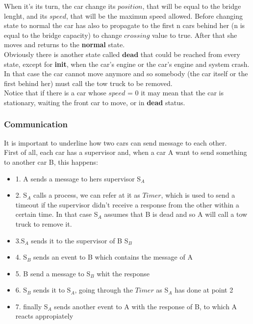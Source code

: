 When it's its turn, the car change its $position$, that will be equal to the bridge lenght, and its $speed$,
that will be the maximun speed allowed. Before changing state to normal the car has also to propagate to the first n cars behind her (n is equal to the bridge capacity) 
to change $crossing$ value to true. After that she moves and returns to the \textbf{normal} state.\\
Obviously there is another state called $\textbf{dead}$ that could be reached from every state, except for \textbf{init}, 
when the car's engine or the car's engine and system crash. In that case the car cannot move anymore 
and so somebody (the car itself or the first behind her) must call the tow truck to be removed. 
\\Notice that if there is a car whose $speed$ = 0 it may mean that the car is stationary, waiting the front
 car to move, or in \textbf{dead} status.\\

\subsubsection{Communication}

It is important to underline how two cars can send message to each other. \\
First of all, each car has a supervisor and, when a car A want to send something to another car B,
this happens:
\begin{itemize}
   \item{1.} A sends a message to hers supervisor S$_{A}$
   \item {2.} S$_{A}$ calls a process, we can refer at it as $Timer$, which is used to send a timeout
   if the supervisor didn't receive a response from the other within a certain time. In that case S$_{A}$ assumes 
   that B is dead and so A will call a tow truck to remove it.
   \item{3.}S$_{A}$ sends it to the supervisor of B S$_{B}$
   \item {4.} S$_{B}$ sends an event to B which contains the message of A
   \item {5.} B send a message to S$_{B}$ whit the response
   \item {6.} S$_{B}$ sends it to S$_{A}$, going through the $Timer$ as S$_{A}$ has done at point 2
   \item {7.} finally S$_{A}$ sends another event to A with the response of B, to which A reacts appropiately
\end{itemize}

